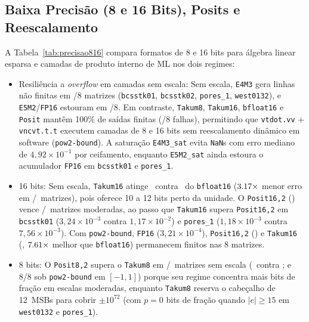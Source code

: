 \documentclass[conference]{IEEEtran}
\begin{document}
\subsection{Baixa Precis\~ao (8 e 16 Bits), Posits e Reescalamento}
A Tabela~\ref{tab:precisao816} compara formatos de 8 e 16 bits para \'algebra linear esparsa e camadas de produto interno de ML nos dois regimes:
\begin{itemize}
    \item Resili\^encia a \emph{overflow} em camadas sem escala: Sem escala, \texttt{E4M3} gera linhas n\~ao finitas em \NFEquatrom/8 matrizes (\texttt{bcsstk01}, \texttt{bcsstk02}, \texttt{pores\_1}, \texttt{west0132}), e \texttt{E5M2}/\texttt{FP16} estouram em \NFCincodois/8. Em contraste, \texttt{Takum8}, \texttt{Takum16}, \texttt{bfloat16} e \texttt{Posit} mant\^em 100\% de sa\'idas finitas (\NFTakumOito/8 falhas), permitindo que \texttt{vtdot.vv} + \texttt{vncvt.t.t} executem camadas de 8 e 16 bits sem reescalamento din\^amico em software (\texttt{pow2-bound}). A satura\c{c}\~ao \texttt{E4M3\_sat} evita \texttt{NaN}s com erro mediano de $4{,}92\times 10^{-1}$ por ceifamento, enquanto \texttt{E5M2\_sat} ainda estoura o acumulador \texttt{FP16} em \texttt{bcsstk01} e \texttt{pores\_1}.
    \item 16 bits: Sem escala, \texttt{Takum16} atinge \MedTakumDez\ contra \MedBF\ do \texttt{bfloat16} ($3.17\times$ menor erro em \ParDezBFTakumVence/\ParDezBFAmbos\ matrizes), pois oferece 10 a 12 bits perto da unidade. O \texttt{Posit16,2} (\MedPositDez) vence \ParDezPositOutroVence/\ParDezPositAmbos\ matrizes moderadas, ao passo que \texttt{Takum16} supera \texttt{Posit16,2} em \texttt{bcsstk01} ($3{,}24\times 10^{-3}$ contra $1{,}17\times 10^{-2}$) e \texttt{pores\_1} ($1{,}18\times 10^{-3}$ contra $7{,}56\times 10^{-3}$). Com \texttt{pow2-bound}, \texttt{FP16} ($3{,}21\times 10^{-4}$), \texttt{Posit16,2} (\MedPositDezScaled) e \texttt{Takum16} (\MedTakumDezScaled, $7.61\times$ melhor que \texttt{bfloat16}) permanecem finitos nas 8 matrizes.
    \item 8 bits: O \texttt{Posit8,2} supera o \texttt{Takum8} em \ParOitoPositOutroVence/\ParOitoPositAmbos\ matrizes sem escala (\MedPositOito\ contra \MedTakumOito; e 8/8 sob \texttt{pow2-bound} em $[-1,1]$) porque seu regime concentra mais bits de fra\c{c}\~ao em escalas moderadas, enquanto \texttt{Takum8} reserva o cabe\c{c}alho de 12~MSBs para cobrir $\pm 10^{72}$ (com $p=0$ bits de fra\c{c}\~ao quando $|e|\ge 15$ em \texttt{west0132} e \texttt{pores\_1}).
\end{itemize}
\end{document}
